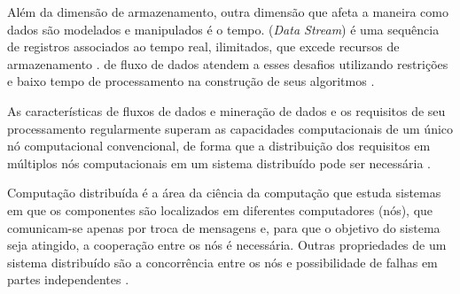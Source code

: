 Além da dimensão de armazenamento, outra dimensão que afeta a maneira como dados
são modelados e manipulados é o tempo.
 (\emph{Data Stream}) é
uma sequência de registros
associados ao tempo
real, ilimitados, que excede recursos de armazenamento \cite{Gaber2005}.
 de fluxo de dados atendem a esses desafios utilizando
restrições  e baixo tempo de
processamento na construção de seus algoritmos \cite{Gama2007, Gaber2005}.




As características de fluxos de dados e mineração de dados e os requisitos de
seu processamento regularmente superam as capacidades computacionais de um único
nó computacional convencional, de forma que a distribuição dos requisitos em
múltiplos nós computacionais em um sistema distribuído pode ser necessária
\cite{Gaber2005}.

Computação distribuída é a área da ciência da computação que estuda sistemas
em que os componentes são localizados em diferentes computadores (nós), que
comunicam-se apenas por troca de mensagens e, para que o objetivo do sistema
seja atingido, a cooperação entre os nós é necessária.
Outras propriedades de um sistema distribuído são a concorrência entre os nós e
possibilidade de
falhas em partes independentes \cite{TanenbaumSteen2018}.


 
